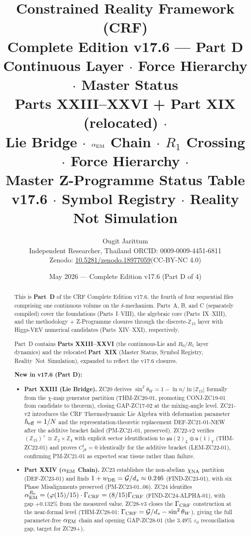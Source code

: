 \documentclass[12pt, a4paper]{article}
\title{%
  \textbf{\color{deepblue}Constrained Reality Framework (CRF)}\\[0.4em]
  \large Complete Edition v17.6 --- Part D\\
  \large Continuous Layer $\cdot$ Force Hierarchy $\cdot$ Master Status\\[0.3em]
  \normalsize\color{mutedgray}
  Parts XXIII--XXVI + Part XIX (relocated) $\cdot$\\
  Lie Bridge $\cdot$ $\alpha_{\rm EM}$ Chain $\cdot$ $R_1$ Crossing $\cdot$
  Force Hierarchy $\cdot$\\
  Master Z-Programme Status Table v17.6 $\cdot$
  Symbol Registry $\cdot$ Reality Not Simulation
}
\author{Ougit Jarittum\\
\small Independent Researcher, Thailand\quad
ORCID: 0009-0009-4451-6811\\
\small Zenodo: \href{https://doi.org/10.5281/zenodo.18977059}{10.5281/zenodo.18977059}\quad (CC-BY-NC 4.0)
}
\date{May 2026 --- Complete Edition v17.6 (Part D of 4)}
\begin{document}

\maketitle

\begin{abstract}
\sloppy
This is \textbf{Part~D} of the CRF Complete Edition v17.6, the fourth
of four sequential files comprising one continuous volume on the
$\delta$-mechanism. Parts~A, B, and C (separately compiled) cover
the foundations (Parts~I--VIII), the algebraic core (Parts~IX--XIII),
and the methodology + Z-Programme closures through the
discrete-$\mathbb{Z}_{15}$ layer with Higgs-VEV numerical candidates
(Parts~XIV--XXI), respectively.

Part~D contains \textbf{Parts XXIII--XXVI} (the continuous-Lie and
$R_0$/$R_1$ layer dynamics) and the relocated \textbf{Part~XIX}
(Master Status, Symbol Registry, Reality~Not~Simulation), expanded
to reflect the v17.6 closures.

\textbf{New in v17.6 (Part D):}
\begin{itemize}[leftmargin=2em]
\item \textbf{Part XXIII (Lie Bridge).} ZC20 derives
$\sin^2\theta_W = 1 - \ln n/\ln|\mathbb{Z}_{15}|$ formally from
the $\chi$-map generator partition (THM-ZC20-01, promoting
CONJ-ZC19-01 from candidate to theorem), closing GAP-ZC17-02 at the
mixing-angle level. ZC21-v2 introduces the CRF Thermodynamic Lie
Algebra with deformation parameter $\hbar_{\rm eff} = 1/N$ and the
representation-theoretic replacement DEF-ZC21-01-NEW after the
additive bracket failed (PM-ZC21-01, preserved). ZC22-v2 verifies
$(\mathbb{Z}_{15})^\times \cong \mathbb{Z}_2 \times \mathbb{Z}_4$
with explicit sector identification to $\mathfrak{su}(2)_L \oplus
\mathfrak{u}(1)_Y$ (THM-ZC22-01) and proves $C_{jk}^l = 0$ identically
for the additive bracket (LEM-ZC22-01), confirming PM-ZC21-01 as
expected scar tissue rather than failure.

\item \textbf{Part XXIV ($\alpha_{\rm EM}$ Chain).} ZC23 establishes
the non-abelian $\chi_{\rm NA}$ partition (DEF-ZC23-01) and finds
$1 + w_{\rm DE} = \mathcal{G}/d_s \approx 0.246$ (FIND-ZC23-01),
with six Phase Misalignments preserved (PM-ZC23-01..06). ZC24
identifies $\alpha_{\rm EM}^{R_0} = (\varphi(15)/15)\cdot\Gamma_{\rm CRF}
= (8/15)\Gamma_{\rm CRF}$ (FIND-ZC24-ALPHA-01), with gap $+0.132\%$
from the measured value. ZC28-v3 closes the $\Gamma_{\rm CRF}$
construction at the near-formal level (THM-ZC28-01:
$\Gamma_{\rm CRF} = \mathcal{G}/d_s - \sin^2\theta_W$), giving the
full parameter-free $\alpha_{\rm EM}$ chain and opening GAP-ZC28-01
(the $3.49\%$ $\varepsilon_0$ reconciliation gap, target for ZC29+).


\end{itemize}
\end{abstract}
\end{document}

